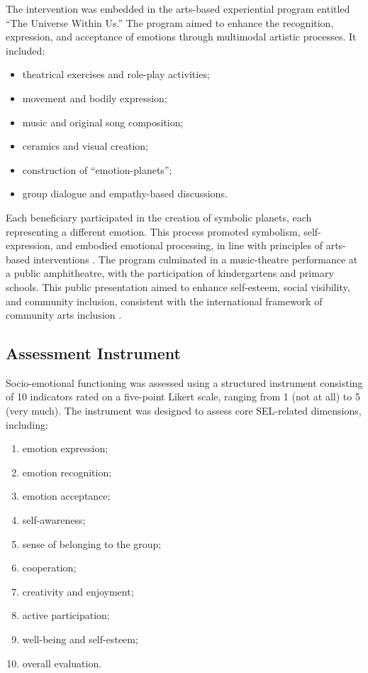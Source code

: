 \documentclass[12pt,a4paper]{article}
\begin{document}
The intervention was embedded in the arts-based experiential program entitled ``The Universe Within Us.'' The program aimed to enhance the recognition, expression, and acceptance of emotions through multimodal artistic processes. It included:

\begin{itemize}
    \item theatrical exercises and role-play activities;
    \item movement and bodily expression;
    \item music and original song composition;
    \item ceramics and visual creation;
    \item construction of ``emotion-planets'';
    \item group dialogue and empathy-based discussions.
\end{itemize}

Each beneficiary participated in the creation of symbolic planets, each representing a different emotion. This process promoted symbolism, self-expression, and embodied emotional processing, in line with principles of arts-based interventions \citep{malchiodi2020,goldstein2017,hinz2009}. The program culminated in a music-theatre performance at a public amphitheatre, with the participation of kindergartens and primary schools. This public presentation aimed to enhance self-esteem, social visibility, and community inclusion, consistent with the international framework of community arts inclusion \citep{nicholson2005,white2013}.

\subsection{Assessment Instrument}

Socio-emotional functioning was assessed using a structured instrument consisting of 10 indicators rated on a five-point Likert scale, ranging from 1 (not at all) to 5 (very much). The instrument was designed to assess core SEL-related dimensions, including:

\begin{enumerate}
    \item emotion expression;
    \item emotion recognition;
    \item emotion acceptance;
    \item self-awareness;
    \item sense of belonging to the group;
    \item cooperation;
    \item creativity and enjoyment;
    \item active participation;
    \item well-being and self-esteem;
    \item overall evaluation.
\end{enumerate}
\end{document}
